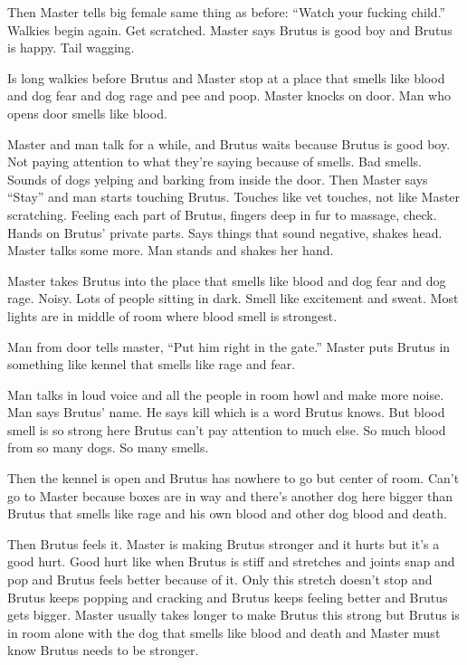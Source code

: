 Then Master tells big female same thing as before: ``Watch your fucking child.''  Walkies begin again.  Get scratched.  Master says Brutus is good boy and Brutus is happy.  Tail wagging.



Is long walkies before Brutus and Master stop at a place that smells like blood and dog fear and dog rage and pee and poop.  Master knocks on door.  Man who opens door smells like blood.



Master and man talk for a while, and Brutus waits because Brutus is good boy.  Not paying attention to what they're saying because of smells.  Bad smells.  Sounds of dogs yelping and barking from inside the door.  Then Master says ``Stay'' and man starts touching Brutus.  Touches like vet touches, not like Master scratching.  Feeling each part of Brutus, fingers deep in fur to massage, check.  Hands on Brutus' private parts.  Says things that sound negative, shakes head.  Master talks some more.  Man stands and shakes her hand.



Master takes Brutus into the place that smells like blood and dog fear and dog rage.  Noisy.  Lots of people sitting in dark.  Smell like excitement and sweat.  Most lights are in middle of room where blood smell is strongest.



Man from door tells master, ``Put him right in the gate.''  Master puts Brutus in something like kennel that smells like rage and fear.



Man talks in loud voice and all the people in room howl and make more noise.  Man says Brutus' name.  He says kill which is a word Brutus knows.  But blood smell is so strong here Brutus can't pay attention to much else.  So much blood from so many dogs.  So many smells.



Then the kennel is open and Brutus has nowhere to go but center of room.  Can't go to Master because boxes are in way and there's another dog here bigger than Brutus that smells like rage and his own blood and other dog blood and death.



Then Brutus feels it.  Master is making Brutus stronger and it hurts but it's a good hurt.  Good hurt like when Brutus is stiff and stretches and joints snap and pop and Brutus feels better because of it.  Only this stretch doesn't stop and Brutus keeps popping and cracking and Brutus keeps feeling better and Brutus gets bigger.  Master usually takes longer to make Brutus this strong but Brutus is in room alone with the dog that smells like blood and death and Master must know Brutus needs to be stronger.



